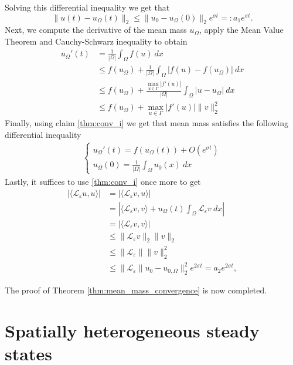 \documentclass[12pt, a4paper]{article}
\theoremstyle{break}
\theoremstyle{break}
\theoremstyle{break}
\theoremstyle{break}
\theoremstyle{break}
\newcommand{\Leo}{\mathcal{L}_{\varepsilon}}
\begin{document}
Solving this differential inequality we get that
\begin{equation*}
    \|u(t) - u_\Omega(t)\|_2 \leq \|u_0 - u_{\Omega}(0)\|_2 e^{\sigma t} =: a_1 e^{\sigma t}.
\end{equation*}
Next, we compute the derivative of the mean mass $u_\Omega$, apply the Mean Value Theorem and Cauchy-Schwarz inequality to obtain
\begin{align*}
    u_\Omega'(t) 
    &= \frac{1}{|\Omega|} \int_\Omega f(u)\:dx \\
    &\leq f(u_\Omega) + \frac{1}{|\Omega|} \int_\Omega \left|f(u) - f(u_\Omega)\right|\:dx \\
    &\leq f(u_\Omega) + \frac{\max_{u \in \Gamma} |f'(u)|}{|\Omega|} \int_\Omega |u - u_\Omega|\:dx \\
    &\leq f(u_\Omega) + \max_{u \in \Gamma} |f'(u)| \|v\|_2^2
\end{align*}
Finally, using claim \ref{thm:conv_i} we get that mean mass satisfies the following differential inequality
\begin{align*}
    \begin{cases}
        u_\Omega'(t) = f(u_\Omega(t)) + O(e^{\sigma t}) \\
        u_\Omega(0) = \frac{1}{|\Omega|}\int_\Omega u_0(x)\:dx
    \end{cases}    
\end{align*}
Lastly, it suffices to use \ref{thm:conv_i} once more to get
\begin{align*}
    \left| \langle \Leo u, u \rangle \right| &= \left| \langle \Leo v, u \rangle \right|\\
    &= \left| \langle \Leo v, v \rangle + u_\Omega(t) \int_\Omega \Leo v \:dx \right| \\
    &= \left|\langle \Leo v, v \rangle\right| \\
    &\leq \|\Leo v\|_2 \|v\|_2 \\
    &\leq \|\Leo \| \|v\|_2^2 \\
    &\leq \|\Leo\|u_0 - u_{0, \Omega}\|_2^2 e^{2\sigma t} = a_2 e^{2\sigma t},
\end{align*}

The proof of Theorem \ref{thm:mean_mass_convergence} is now completed.

\section{Spatially heterogeneous steady states} \label{sec:hetero_asymptotics}
\end{document}
